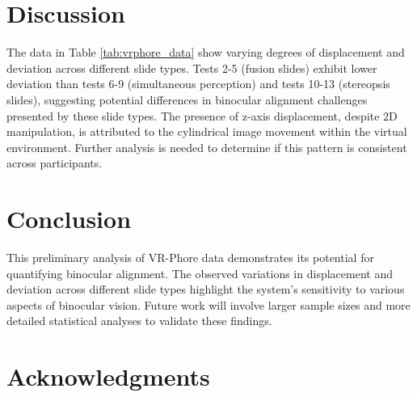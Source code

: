 \documentclass[conference]{IEEEtran}
\begin{document}
\section{Discussion}
The data in Table \ref{tab:vrphore_data} show varying degrees of displacement and deviation across different slide types.  Tests 2-5 (fusion slides) exhibit lower deviation than tests 6-9 (simultaneous perception) and tests 10-13 (stereopsis slides), suggesting potential differences in binocular alignment challenges presented by these slide types.  The presence of z-axis displacement, despite 2D manipulation, is attributed to the cylindrical image movement within the virtual environment. Further analysis is needed to determine if this pattern is consistent across participants.

\section{Conclusion}
This preliminary analysis of VR-Phore data demonstrates its potential for quantifying binocular alignment. The observed variations in displacement and deviation across different slide types highlight the system's sensitivity to various aspects of binocular vision. Future work will involve larger sample sizes and more detailed statistical analyses to validate these findings.


\section*{Acknowledgments}


\end{document}
